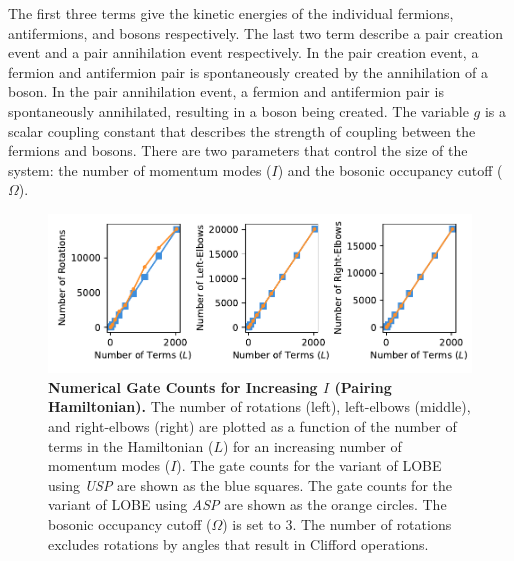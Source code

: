 The first three terms give the kinetic energies of the individual fermions, antifermions, and bosons respectively.
The last two term describe a pair creation event and a pair annihilation event respectively.
In the pair creation event, a fermion and antifermion pair is spontaneously created by the annihilation of a boson.
In the pair annihilation event, a fermion and antifermion pair is spontaneously annihilated, resulting in a boson being created. 
The variable $g$ is a scalar coupling constant that describes the strength of coupling between the fermions and bosons. 
There are two parameters that control the size of the system: the number of momentum modes ($I$) and the bosonic occupancy cutoff ($\Omega$).

\begin{figure}
    \centering
    \includegraphics[width=16cm]{figures/pairing_hamiltonian_gates_vs_terms.pdf}
    \caption{
        \textbf{Numerical Gate Counts for Increasing $I$ (Pairing Hamiltonian).}
        The number of rotations (left), left-elbows (middle), and right-elbows (right) are plotted as a function of the number of terms in the Hamiltonian ($L$) for an increasing number of momentum modes ($I$).
        The gate counts for the variant of LOBE using \textit{USP} are shown as the blue squares.
        The gate counts for the variant of LOBE using \textit{ASP} are shown as the orange circles.
        The bosonic occupancy cutoff ($\Omega$) is set to $3$.
        The number of rotations excludes rotations by angles that result in Clifford operations.
    }
    \label{fig:pairing_hamiltonian_gates_vs_terms}
\end{figure}
